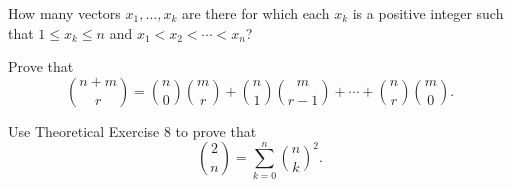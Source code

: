 \begin{problem}[Ross, \S 1, \# 6]
  How many vectors \(x_1,\dotsc,x_k\) are there for which each \(x_k\) is a
  positive integer such that \(1\leq x_k\leq n\) and \(x_1<x_2<\dotsb<
  x_n\)?
\end{problem}
\begin{solution*}
\end{solution*}

\begin{problem}[Ross, \S 1, \# 8]
  Prove that
  \[
    \binom{n+m}{r}=%
    \binom{n}{0}\binom{m}{r}+\binom{n}{1}\binom{m}{r-1}%
    +\dotsb+\binom{n}{r}\binom{m}{0}.
  \]
\end{problem}
\begin{solution*}
\end{solution*}

\begin{problem}[Ross, \S 1, \# 9]
  Use Theoretical Exercise 8 to prove that
  \[
    \binom{2}{n}=\sum_{k=0}^n\binom{n}{k}^2.
  \]
\end{problem}
\begin{solution*}
\end{solution*}

